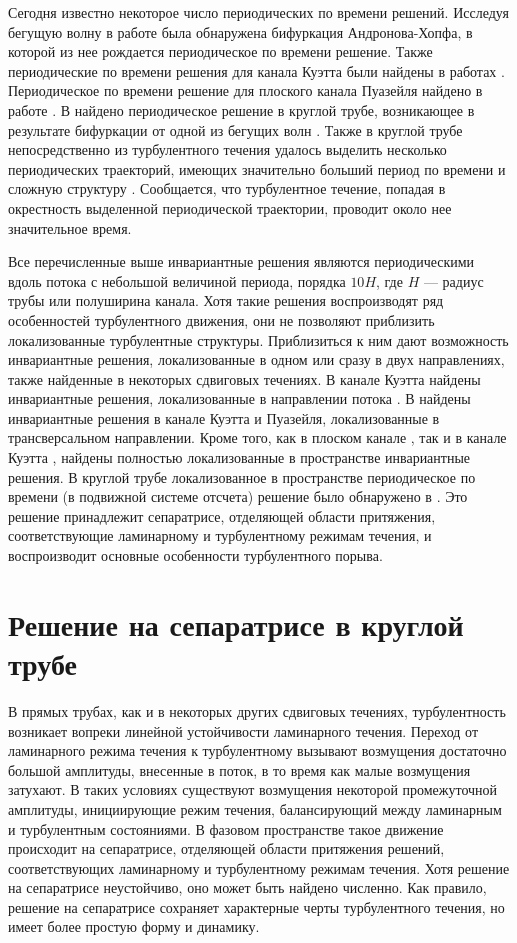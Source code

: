 Сегодня известно некоторое число периодических по времени решений. Исследуя бегущую волну \cite{Nagata1990} в работе \cite{Clever1997} была обнаружена бифуркация Андронова-Хопфа, в которой из нее рождается периодическое по времени решение. Также периодические по времени решения для канала Куэтта были найдены в работах \cite{Kawahara2001, Viswanath2007}. Периодическое по времени решение для плоского канала Пуазейля найдено в работе \cite{Toh2003}. В \cite{Duguet2008} найдено периодическое решение в круглой трубе, возникающее в результате бифуркации от одной из бегущих волн \cite{Pringle2007}. Также в круглой трубе непосредственно из турбулентного течения удалось выделить несколько периодических траекторий, имеющих значительно больший период по времени и сложную структуру \cite{Altmeyer2015}. Сообщается, что турбулентное течение, попадая в окрестность выделенной периодической траектории, проводит около нее значительное время. 

Все перечисленные выше инвариантные решения являются периодическими вдоль потока с небольшой величиной периода, порядка $10H$, где $H$ --- радиус трубы или полуширина канала. Хотя такие решения воспроизводят ряд особенностей турбулентного движения, они не позволяют приблизить локализованные турбулентные структуры. Приблизиться к ним дают возможность инвариантные решения, локализованные в одном или сразу в двух направлениях, также найденные в некоторых сдвиговых течениях. В канале Куэтта найдены инвариантные решения, локализованные в направлении потока \cite{Cherhabili1997, Ehrenstein2008, Schneider2010}. В \cite{Gibson2014} найдены инвариантные решения в канале Куэтта и Пуазейля, локализованные в трансверсальном направлении. Кроме того, как в плоском канале \cite{Zammert2014}, так и в канале Куэтта \cite{Brand2014}, найдены полностью локализованные в пространстве инвариантные решения. В круглой трубе локализованное в пространстве периодическое по времени (в подвижной системе отсчета) решение было обнаружено в \cite{Avila2013}. Это решение принадлежит сепаратрисе, отделяющей области притяжения, соответствующие ламинарному и турбулентному режимам течения, и воспроизводит основные особенности турбулентного порыва. 


\section{Решение на сепаратрисе в круглой трубе}

В прямых трубах, как и в некоторых других сдвиговых течениях, турбулентность возникает вопреки линейной устойчивости ламинарного течения. Переход от ламинарного режима течения к турбулентному вызывают возмущения достаточно большой амплитуды, внесенные в поток, в то время как малые возмущения затухают. В таких условиях существуют возмущения некоторой промежуточной амплитуды, инициирующие режим течения, балансирующий между ламинарным и турбулентным состояниями. В фазовом пространстве такое движение происходит на сепаратрисе, отделяющей области притяжения решений, соответствующих ламинарному и турбулентному режимам течения. Хотя решение на сепаратрисе неустойчиво, оно может быть найдено численно. Как правило, решение на сепаратрисе сохраняет характерные черты турбулентного течения, но имеет более простую форму и динамику.

